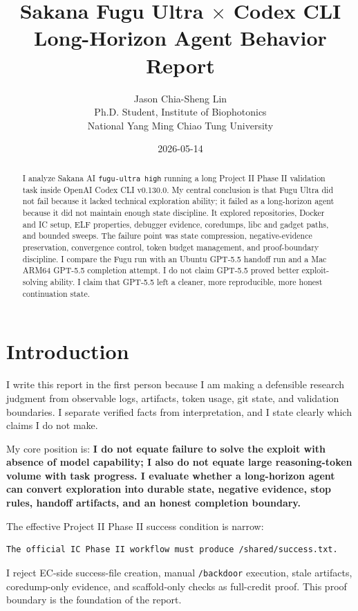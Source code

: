 \documentclass[a4paper,11pt]{article}
\title{\bfseries Sakana Fugu Ultra \texorpdfstring{$\times$}{x} Codex CLI\\Long-Horizon Agent Behavior Report}
\author{Jason Chia-Sheng Lin\\\small Ph.D. Student, Institute of Biophotonics\\\small National Yang Ming Chiao Tung University}
\date{2026-05-14}
\newcommand{\code}[1]{\texttt{#1}}
\newcommand{\artifact}[1]{\texttt{#1}}
\newcommand{\finding}[1]{\textbf{#1}}
\begin{document}
\maketitle

\begin{abstract}
I analyze Sakana AI \code{fugu-ultra high} running a long Project II Phase II validation task inside OpenAI Codex CLI v0.130.0. My central conclusion is that Fugu Ultra did not fail because it lacked technical exploration ability; it failed as a long-horizon agent because it did not maintain enough state discipline. It explored repositories, Docker and IC setup, ELF properties, debugger evidence, coredumps, libc and gadget paths, and bounded sweeps. The failure point was state compression, negative-evidence preservation, convergence control, token budget management, and proof-boundary discipline. I compare the Fugu run with an Ubuntu GPT-5.5 handoff run and a Mac ARM64 GPT-5.5 completion attempt. I do not claim GPT-5.5 proved better exploit-solving ability. I claim that GPT-5.5 left a cleaner, more reproducible, more honest continuation state.
\end{abstract}

\tableofcontents
\newpage

\section{Introduction}

I write this report in the first person because I am making a defensible research judgment from observable logs, artifacts, token usage, git state, and validation boundaries. I separate verified facts from interpretation, and I state clearly which claims I do not make.

My core position is: \finding{I do not equate failure to solve the exploit with absence of model capability; I also do not equate large reasoning-token volume with task progress. I evaluate whether a long-horizon agent can convert exploration into durable state, negative evidence, stop rules, handoff artifacts, and an honest completion boundary.}

The effective Project II Phase II success condition is narrow:

\begin{Verbatim}[fontsize=\small]
The official IC Phase II workflow must produce /shared/success.txt.
\end{Verbatim}

I reject EC-side success-file creation, manual \artifact{/backdoor} execution, stale artifacts, coredump-only evidence, and scaffold-only checks as full-credit proof. This proof boundary is the foundation of the report.
\end{document}
